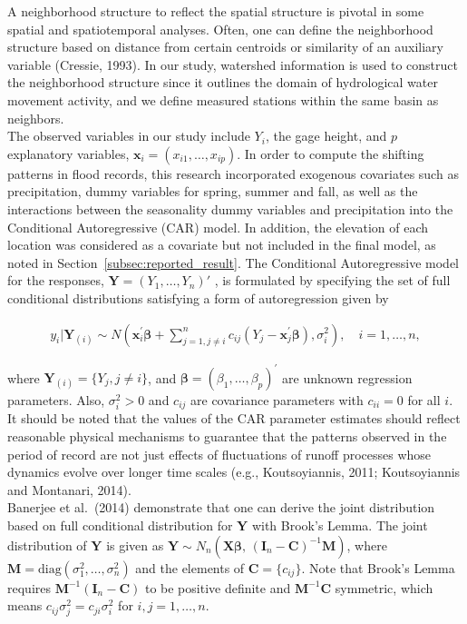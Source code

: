 
A neighborhood structure to reflect the spatial structure is pivotal in some spatial and spatiotemporal analyses.
Often, one can define the neighborhood structure based on distance from certain centroids or similarity of an auxiliary variable (Cressie, 1993).
In our study, watershed information is used  to construct the neighborhood structure since it outlines the domain of hydrological water movement activity, and we define  measured stations within the same basin as neighbors. \\

The observed variables in our study include $ Y_i$, the gage height, and $ p$ explanatory variables, $ \mathbf x_i = (x_{i1}, \ldots, x_{ip})$.
In order to compute the shifting patterns in flood records, this research incorporated exogenous covariates such as precipitation, dummy variables for spring, summer and fall, as well as the interactions between the seasonality dummy variables and precipitation into the Conditional Autoregressive (CAR) model.
In addition,  the elevation of each location was considered as a covariate but not included in the final model, as noted in Section~\ref{subsec:reported_result}.
The Conditional Autoregressive  model for the responses, $\mathbf Y = (Y_1, \ldots, Y_n )'$ , is formulated by specifying the set of full conditional distributions satisfying a form of autoregression given by

\begin{align*}
y_i|\mathbf Y_{(i)} \sim N \left( \mathbf x_i^{'}\boldsymbol{\beta} + \sum_{j=1, j\neq i}^n c_{ij}(Y_j - \mathbf x_j^{'} \boldsymbol{\beta}), \sigma_i^2\right), \quad i = 1, \ldots, n,
\end{align*}

\noindent where $\mathbf Y_{(i)} = \{ Y_{j}, j \neq i\}$, and  $\boldsymbol{\beta} = (\beta_1, \ldots, \beta_p)^{'}$  are unknown regression parameters. Also, $ \sigma_i^2 > 0$ and $ c_{ij}$ are covariance parameters with $ c_{ii} = 0$ for all $ i$.
It should be noted that
 the values of the CAR parameter estimates should reflect reasonable physical mechanisms to guarantee that the patterns observed in the period of record are not just effects of fluctuations of runoff processes whose dynamics evolve over longer time scales (e.g., Koutsoyiannis, 2011;
 Koutsoyiannis and Montanari, 2014). \\

Banerjee et al.\ (2014) demonstrate that one can derive the joint distribution based on full conditional distribution for $ \mathbf Y $ with Brook's Lemma.
The joint distribution of $ \mathbf Y$ is given as $\mathbf Y \sim N_n(\mathbf X\boldsymbol{\beta}, \, (\mathbf I_n -\mathbf C)^{-1}\mathbf M)$, where  $\mathbf M = \text{diag}(\sigma_{1}^2, \ldots, \sigma^2_{n})$ and the elements of  $\mathbf C = \{ c_{ij} \}$.
Note that Brook's Lemma requires $\mathbf M^{-1}(\mathbf I_n - \mathbf C)$ to be  positive definite and $\mathbf M^{-1}\mathbf C$ symmetric, which means $ c_{ij}\sigma_j^2 = c_{ji}\sigma_i^2$ for $ i, j = 1, \ldots, n$. \\


